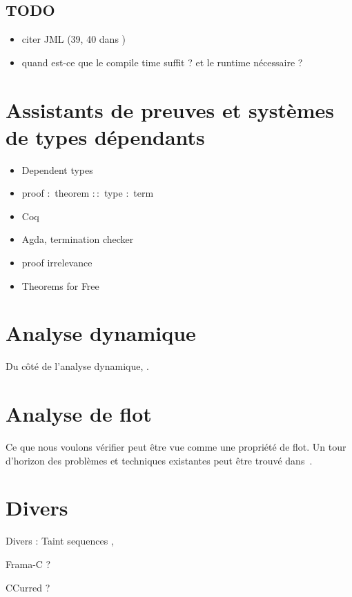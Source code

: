 \subsection*{TODO}

\begin{itemize}
\item
  citer JML (39, 40 dans \cite{krml136})
\item
  quand est-ce que le compile time suffit ? et le runtime nécessaire ?
\end{itemize}

\section{Assistants de preuves et systèmes de types dépendants}

\begin{itemize}
\item Dependent types
\item proof $:$ theorem $::$ type $:$ term
\item Coq
\item Agda, termination checker
\item proof irrelevance
\item Theorems for Free\cite{theoremsforfree}
\end{itemize}


\section{Analyse dynamique}

Du côté de l'analyse dynamique, \cite{oakland10}.

\section{Analyse de flot}

Ce que nous voulons vérifier peut être vue comme une propriété de flot. Un tour
d'horizon des problèmes et techniques existantes peut être trouvé
dans~\cite{sm-jsac03}.

\section{Divers}

Divers : Taint sequences \cite{mdv10},

Frama-C ?

CCurred ?

